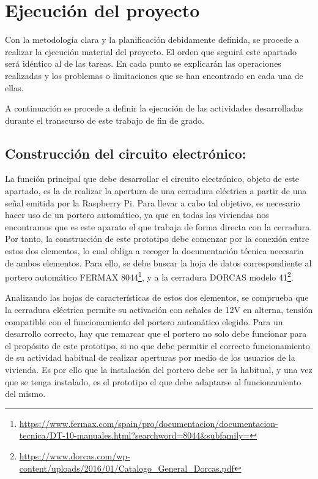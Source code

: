\section{Ejecución del proyecto} 
\label{sec:ejecucion-del-proyecto}
Con la metodología clara y la planificación debidamente definida, se procede a realizar la ejecución material del proyecto. El orden que seguirá este apartado será idéntico al de las tareas. En cada punto se explicarán las operaciones realizadas y los problemas o limitaciones que se han encontrado en cada una de ellas.

A continuación se procede a definir la ejecución de las actividades desarrolladas durante el transcurso de este trabajo de fin de grado.

\subsection{Construcción del circuito electrónico:}
La función principal que debe desarrollar el circuito electrónico, objeto de este apartado, es la de realizar la apertura de una cerradura eléctrica a partir de una señal emitida por la Raspberry Pi. Para llevar a cabo tal objetivo, es necesario hacer uso de un portero automático, ya que en todas las viviendas nos encontramos que es este aparato el que trabaja de forma directa con la cerradura.
Por tanto, la construcción de este prototipo debe comenzar por la conexión entre estos dos elementos, lo cual obliga a recoger la documentación técnica necesaria de ambos elementos. Para ello, se debe buscar la hoja de datos correspondiente al portero automático FERMAX 8044\footnote{\url{https://www.fermax.com/spain/pro/documentacion/documentacion-tecnica/DT-10-manuales.html?searchword=8044&subfamily=}}, y a la cerradura DORCAS modelo 41\footnote{\url{https://www.dorcas.com/wp-content/uploads/2016/01/Catalogo_General_Dorcas.pdf}}.

Analizando las hojas de características de estos dos elementos, se comprueba que la cerradura eléctrica permite su activación con señales de 12V en alterna, tensión compatible con el funcionamiento del portero automático elegido.
Para un desarrollo correcto, hay que remarcar que el portero no solo debe funcionar para el propósito de este prototipo, si no que debe permitir el correcto funcionamiento de su actividad habitual de realizar aperturas por medio de los usuarios de la vivienda. Es por ello que la instalación del portero debe ser la habitual, y una vez que se tenga instalado, es el prototipo el que debe adaptarse al funcionamiento del mismo.

